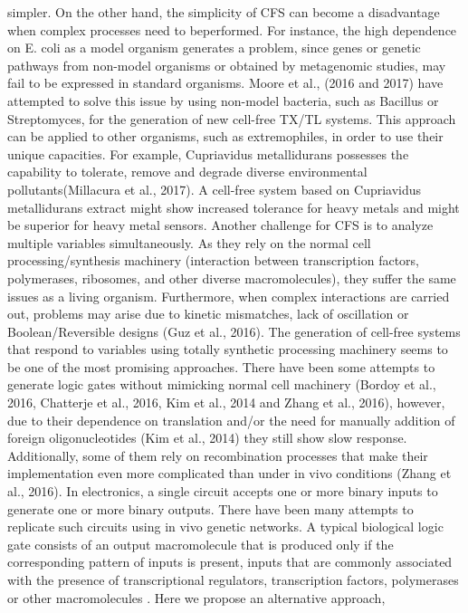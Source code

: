 simpler. On the other hand, the simplicity of CFS can become a disadvantage when
complex processes need to beperformed. For instance, the high dependence on E.
coli as a model organism generates a problem, since genes or genetic pathways
from non-model organisms or obtained by metagenomic studies, may fail to be
expressed in standard organisms. Moore et al., (2016 and 2017) have attempted to
solve this issue by using non-model bacteria, such as Bacillus or Streptomyces,
for the generation of new cell-free TX/TL systems. This approach can be applied
to other organisms, such as extremophiles, in order to use their unique
capacities. For example, Cupriavidus metallidurans possesses the capability to
tolerate, remove and degrade diverse environmental pollutants(Millacura et al.,
2017). A cell-free system based on Cupriavidus metallidurans extract might show
increased tolerance for heavy metals and might be superior for heavy metal
sensors. Another challenge for CFS is to analyze multiple variables
simultaneously. As they rely on the normal cell processing/synthesis machinery
(interaction between transcription factors, polymerases, ribosomes, and other
diverse macromolecules), they suffer the same issues as a living organism.
Furthermore, when complex interactions are carried out, problems may arise due
to kinetic mismatches, lack of oscillation or Boolean/Reversible designs (Guz et
al., 2016). The generation of cell-free systems that respond to variables using
totally synthetic processing machinery seems to be one of the most promising
approaches. There have been some attempts to generate logic gates without
mimicking normal cell machinery (Bordoy et al., 2016, Chatterje et al., 2016,
Kim et al., 2014 and Zhang et al., 2016), however, due to their dependence on
translation and/or the need for manually addition of foreign oligonucleotides
(Kim et al., 2014) they still show slow response. Additionally, some of them
rely on recombination processes that make their implementation even more
complicated than under in vivo conditions (Zhang et al., 2016). In electronics,
a single circuit accepts one or more binary inputs to generate one or more
binary outputs. There have been many attempts to replicate such circuits using
in vivo genetic networks. A typical biological logic gate consists of an output
macromolecule that is produced only if the corresponding pattern of inputs is
present, inputs that are commonly associated with the presence of
transcriptional regulators, transcription factors, polymerases or other
macromolecules \cite{silva2008mining} . Here we propose an alternative approach,
